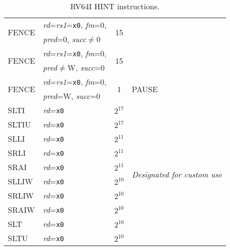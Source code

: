 \begin{table}[hbt]
\begin{tabular}{|l|l|c|l|}
  \multirow{2}{*}{FENCE}& {\em rd}={\em rs1}={\tt x0}, {\em fm}=0,    & \multirow{2}{*}{15}         & \\
                        & {\em pred}=0, {\em succ}$\neq$0             &                             & \\ \cline{1-3}
  \multirow{2}{*}{FENCE}& {\em rd}={\em rs1}={\tt x0}, {\em fm}=0,    & \multirow{2}{*}{15}         & \\
                        & {\em pred}$\neq$W, {\em succ}=0             &                             & \\ \hline
  \multirow{2}{*}{FENCE}& {\em rd}={\em rs1}={\tt x0}, {\em fm}=0,    & \multirow{2}{*}{1}          & \multirow{2}{*}{PAUSE} \\
                        & {\em pred}=W, {\em succ}=0                  &                             & \\ \hline \hline
  SLTI                  & {\em rd}={\tt x0}                           & $2^{17}$                    & \multirow{10}{*}{\em Designated for custom use} \\ \cline{1-3}
  SLTIU                 & {\em rd}={\tt x0}                           & $2^{17}$                    & \\ \cline{1-3}
  SLLI                  & {\em rd}={\tt x0}                           & $2^{11}$                    & \\ \cline{1-3}
  SRLI                  & {\em rd}={\tt x0}                           & $2^{11}$                    & \\ \cline{1-3}
  SRAI                  & {\em rd}={\tt x0}                           & $2^{11}$                    & \\ \cline{1-3}
  SLLIW                 & {\em rd}={\tt x0}                           & $2^{10}$                    & \\ \cline{1-3}
  SRLIW                 & {\em rd}={\tt x0}                           & $2^{10}$                    & \\ \cline{1-3}
  SRAIW                 & {\em rd}={\tt x0}                           & $2^{10}$                    & \\ \cline{1-3}
  SLT                   & {\em rd}={\tt x0}                           & $2^{10}$                    & \\ \cline{1-3}
  SLTU                  & {\em rd}={\tt x0}                           & $2^{10}$                    & \\ \hline
\end{tabular}
\caption{RV64I HINT instructions.}
\label{tab:rv64i-hints}
\end{table}
